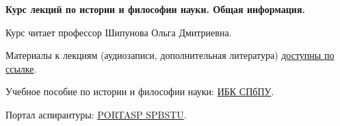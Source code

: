 \documentclass[main.tex]{subfiles}
\begin{document}
{\parindent0pt

\textbf{Курс лекций по истории и философии науки. Общая информация.}

Курс читает профессор Шипунова Ольга Дмитриевна.

Материалы к лекциям (аудиозаписи, дополнительная литература) \href{https://drive.google.com/drive/folders/1iSx2EjJJ98rhPpOsM4xGcJA7-7qitQHM?usp=sharing}{доступны по ссылке}.

Учебное пособие по истории и философии науки: \href{https://elib.spbstu.ru/dl/5/tr/2022/tr22-155.pdf/download/tr22-155.pdf}{ИБК СПбПУ}.

Портал аспирантуры: \href{https://portasp.spbstu.ru/login/index.php}{PORTASP SPBSTU}.

}
\end{document}
